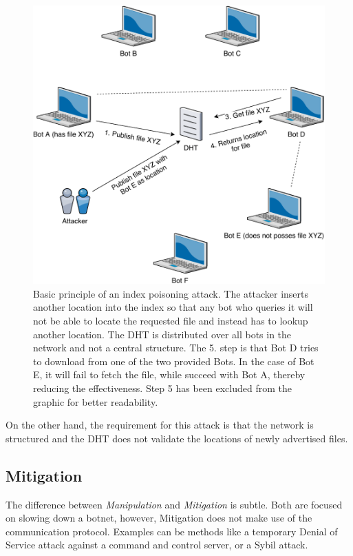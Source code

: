 \documentclass[10pt, a4paper, twocolumn]{article} %
\begin{document}
\begin{figure}[ht]
  \centering
  \includegraphics[width=\linewidth]{figures/index}
  \caption{Basic principle of an index poisoning attack. The attacker inserts another location into the index so that any bot who queries it will not be able to locate the requested file and instead has to lookup another location. The DHT is distributed over all bots in the network and not a central structure. The 5. step is that Bot D tries to download from one of the two provided Bots. In the case of Bot E, it will fail to fetch the file, while succeed with Bot A, thereby reducing the effectiveness. Step 5 has been excluded from the graphic for better readability.}
  \label{indexpoison}
\end{figure} 
On the other hand, the requirement for this attack is that the network is structured and the DHT does not validate the locations of newly advertised files.  
\subsection{Mitigation}\label{sybil}
The difference between \textit{Manipulation} and \textit{Mitigation} is subtle. Both are focused on slowing down a botnet, however, Mitigation does not make use of the communication protocol. Examples can be methods like a temporary Denial of Service attack against a command and control server, or a Sybil attack. 
\end{document}
